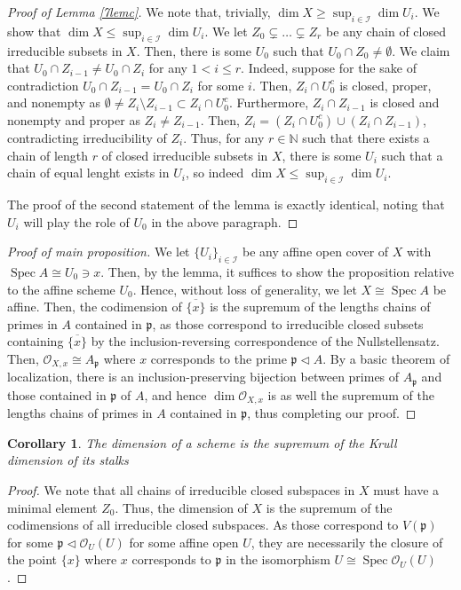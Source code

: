 \documentclass[english,letter,doublesided]{article}
\DeclareMathOperator{\spec}{Spec}
\newcommand{\NN}{\mathbb{N}}
\newcommand{\OO}{\mathcal{O}}
\newcommand{\pfr}{\mathfrak{p}}
\newcommand{\Ical}{\mathcal{I}}
\newenvironment{subproof}[1][\proofname]{%
	\renewcommand{\qedsymbol}{$\blacksquare$}%
	\begin{proof}[#1]%
	}{%
	\end{proof}%
}
\newtheorem*{cor*}{Corollary}
\theoremstyle{remark}
\theoremstyle{definition}
\newcommand{\cl}{\overline}
\begin{document}
\begin{subproof}[Proof of Lemma \ref{7lemc}]
	We note that, trivially, $\dim X\geq \sup_{i\in \Ical}\dim U_i$. We show that $\dim X\leq \sup_{i\in \Ical}\dim U_i$. We let $Z_0\subsetneq\ldots\subsetneq Z_r$ be any chain of closed irreducible subsets in $X$. Then, there is some $U_0$ such that $U_0\cap Z_0\neq \emptyset$. We claim that $U_0\cap Z_{i-1}\neq U_0\cap Z_i$ for any $1<i\leq r$. Indeed, suppose for the sake of contradiction $U_0\cap Z_{i-1}=U_0\cap Z_i$ for some $i$. Then, $Z_{i}\cap U_0^c$ is closed, proper, and nonempty as $\emptyset \neq Z_i\setminus Z_{i-1}\subset Z_i\cap U_0^c$. Furthermore, $Z_i\cap Z_{i-1}$ is closed and nonempty and proper as $Z_i\neq Z_{i-1}$. Then, $Z_i=\left(Z_i\cap U_0^c\right)\cup (Z_i\cap Z_{i-1})$, contradicting irreducibility of $Z_i$. Thus, for any $r\in \NN$ such that there exists a chain of length $r$ of closed irreducible subsets in $X$, there is some $U_i$ such that a chain of equal lenght exists in $U_i$, so indeed $\dim X\leq \sup_{i\in \Ical}\dim U_i$.
	
	The proof of the second statement of the lemma is exactly identical, noting that $U_i$ will play the role of $U_0$ in the above paragraph.
\end{subproof}
\begin{proof}[Proof of main proposition]
	We let $\{U_i\}_{i\in \Ical}$ be any affine open cover of $X$ with $\spec A\cong U_0\ni x$. Then, by the lemma, it suffices to show the proposition relative to the affine scheme $U_0$. Hence, without loss of generality, we let $X\cong \spec A$ be affine. Then, the codimension of $\cl{\{x\}}$ is the supremum of the lengths chains of primes in $A$ contained in $\pfr$, as those correspond to irreducible closed subsets containing $\cl{\{x\}}$ by the inclusion-reversing correspondence of the Nullstellensatz. Then, $\OO_{X,x}\cong A_\pfr$ where $x$ corresponds to the prime $\pfr\triangleleft A$. By a basic theorem of localization, there is an inclusion-preserving bijection between primes of $A_\pfr$ and those contained in $\pfr$ of $A$, and hence $\dim \OO_{X,x}$ is as well the supremum of the lengths chains of primes in $A$ contained in $\pfr$, thus completing our proof.
\end{proof}
\begin{cor*}
The dimension of a scheme is the supremum of the Krull dimension of its stalks
\end{cor*}
\begin{proof}
	We note that all chains of irreducible closed subspaces in $X$ must have a minimal element $Z_0$. Thus, the dimension of $X$ is the supremum of the codimensions of all irreducible closed subspaces. As those correspond to $V(\pfr)$ for some $\pfr\triangleleft \OO_{U}(U)$ for some affine open $U$, they are necessarily the closure of the point $\{x\}$ where $x$ corresponds to $\pfr$ in the isomorphism $U\cong \spec \OO_U(U)$.
\end{proof}
\printbibliography
\end{document}
